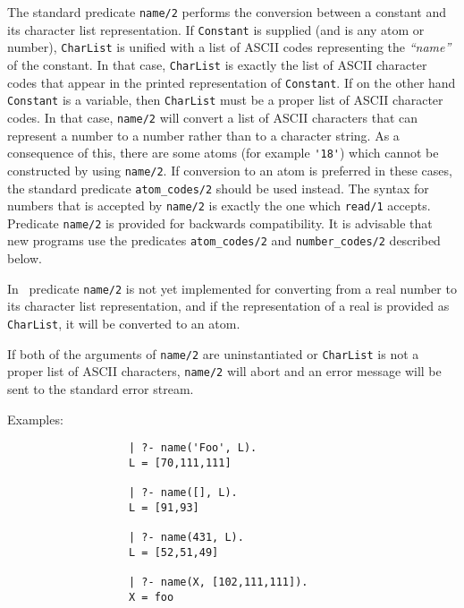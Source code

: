 \begin{description}

    The standard predicate {\tt name/2} performs the conversion 
    between a constant and its character list representation. 
    If {\tt Constant} is supplied (and is any atom or number), {\tt CharList} 
    is unified with a list of ASCII codes representing the {\em ``name''} 
    of the constant.  In that case, {\tt CharList} is exactly the list of 
    ASCII character codes that appear in the printed representation of 
    {\tt Constant}\@.  If on the other hand {\tt Constant} is a variable, 
    then {\tt CharList} must be a proper list of ASCII character codes. 
    In that case, {\tt name/2} will convert a list of ASCII characters 
    that can represent a number to a number rather than to a character string.
    As a consequence of this, there are some atoms (for example \verb|'18'|)
    which cannot be constructed by using {\tt name/2}\@. 
    If conversion to an atom is preferred in these cases, the 
    standard predicate {\tt atom\_codes/2} should be used instead. The 
    syntax for numbers that is accepted by {\tt name/2} is exactly the one 
    which {\tt read/1} accepts.  Predicate {\tt name/2} is provided for 
    backwards compatibility.  It is advisable that new programs use
    the predicates {\tt atom\_codes/2} and {\tt number\_codes/2} described
    below.

    In \version\ predicate {\tt name/2} is not yet implemented for 
    converting from a real number to its character list representation, 
    and if the representation of a real is provided as {\tt CharList}, 
    it will be converted to an atom.

    If both of the arguments of {\tt name/2} are uninstantiated or 
    {\tt CharList} is not a proper list of ASCII characters, {\tt name/2} 
    will abort and an error message will be sent to the standard error stream.

    Examples:
    {\footnotesize
     \begin{verbatim}
                   | ?- name('Foo', L).
                   L = [70,111,111]

                   | ?- name([], L).
                   L = [91,93]

                   | ?- name(431, L).
                   L = [52,51,49]

                   | ?- name(X, [102,111,111]).
                   X = foo
 

\end{verbatim}}
\end{description}
